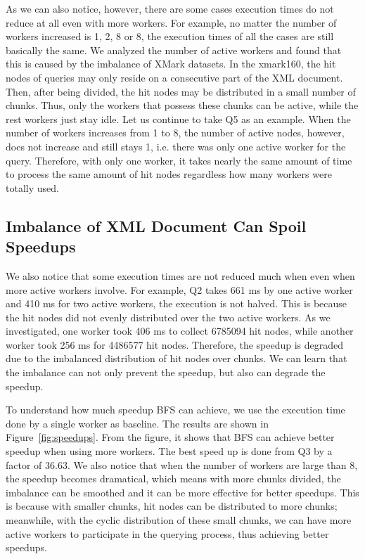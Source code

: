 As we can also notice, however, there are some cases execution times do not
reduce at all even with more workers. For example, no matter the number of
workers increased is 1, 2, 8 or 8, the execution times of all the cases are
still basically the same.  We analyzed the number of active workers and found
that this is caused by the imbalance of XMark datasets. In the xmark160, the hit
nodes of queries may only reside on a consecutive part of the XML document.
Then, after being divided, the hit nodes may be distributed in a small number of
chunks. Thus, only the workers that possess these chunks can be active, while
the rest workers just stay idle. Let us continue to take Q5 as an example. When
the number of workers increases from 1 to 8, the number of active nodes,
however, does not increase and still stays 1, i.e. there was only one active
worker for the query. Therefore, with only one worker, it takes nearly the same
amount of time to process the same amount of hit nodes regardless how many
workers were totally used. 

\subsection{Imbalance of XML Document Can Spoil Speedups}

We also notice that some execution times are not reduced much when even when
more active workers involve. For example, Q2 takes 661 ms by one active worker
and 410 ms for two active workers, the execution is not halved. This is because
the hit nodes did not evenly distributed over the two active workers. As we
investigated, one worker took 406 ms to collect 6785094 hit nodes, while another
worker took 256 ms for 4486577 hit nodes. Therefore, the speedup is degraded due
to the imbalanced distribution of hit nodes over chunks. We can learn that the
imbalance can not only prevent the speedup, but also can degrade the speedup.

To understand how much speedup BFS can achieve, we use the execution time done
by a single worker as baseline. The results are shown in
Figure~\ref{fig:speedups}.  From the figure, it shows that BFS can achieve
better speedup when using more workers. The best speed up is done from Q3 by a
factor of 36.63. We also notice that when the number of workers are large than
8, the speedup becomes dramatical, which means with more chunks divided, the
imbalance can be smoothed and it can be more effective for better speedups. This
is because  with smaller chunks, hit nodes can be distributed to more chunks;
meanwhile,  with the cyclic distribution of these small chunks, we can have more
active workers to participate in the querying process, thus achieving better
speedups. 

